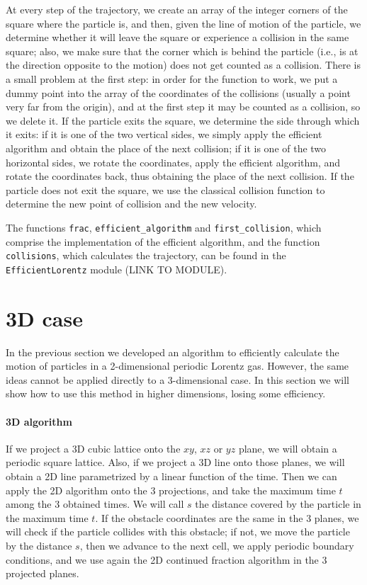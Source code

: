 \documentclass[prl,amsmath,amssymb, twocolumn, showpacs]{revtex4-1}
\begin{document}
At every step of the trajectory, we create an array of the integer corners of the square where the particle is, and then, given the line of motion of the particle, we determine whether it will leave the square or experience a collision in the same square; also, we make sure that the corner which is behind the particle (i.e., is at the direction opposite to the motion) does not get counted as a collision. There is a small problem at the first step: in order for the function to work, we put a dummy point into the array of the coordinates of the collisions (usually a point very far from the origin), and at the first step it may be counted as a collision, so we delete it. If the particle exits the square, we determine the side through which it exits: if it is one of the two vertical sides, we simply apply the efficient algorithm and obtain the place of the next collision; if it is one of the two horizontal sides, we rotate the coordinates, apply the efficient algorithm, and rotate the coordinates back, thus obtaining the place of the next collision. If the particle does not exit the square, we use the classical collision function to determine the new point of collision and the new velocity.

The functions \texttt{frac}, \texttt{efficient\_algorithm} and \texttt{first\_collision}, which comprise the implementation of the efficient algorithm, and the function \texttt{collisions}, which calculates the trajectory, can be found in the \texttt{EfficientLorentz} module (LINK TO MODULE).


\section{3D case}

In the previous section we developed an algorithm to efficiently calculate the motion of particles in a 2-dimensional periodic Lorentz gas. However, the same ideas cannot be applied directly to a 3-dimensional case. In this section we will show how to use this method in higher dimensions, losing some efficiency.

\paragraph{3D algorithm} If we project a 3D cubic lattice onto the $xy$, $xz$ or $yz$ plane, we will obtain a periodic square lattice. Also, if we project a 3D line onto those planes, we will obtain a 2D line parametrized by a linear function of the time. 
Then we can apply the 2D algorithm onto the 3 projections, and take the maximum time $t$ among the 3 obtained times. We will call $s$ the distance covered by the particle in the maximum time $t$. If the obstacle coordinates are the same in the 3 planes, we will check if the particle collides with this obstacle; if not, we move the particle by the distance $s$, then we advance to the next cell, we apply periodic boundary conditions, and we use again the 2D continued fraction algorithm in the 3 projected planes. 
\end{document}
